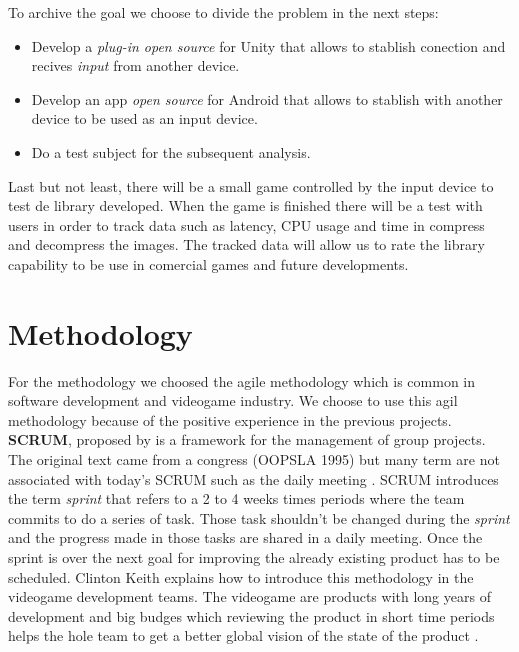 To archive the goal we choose to divide the problem in the next steps:

\begin {itemize}
\item Develop a \textit{plug-in open source} for Unity that allows to stablish conection and recives \textit{input} from another device.
\item Develop an app \textit{open source} for Android that allows to stablish with another device to be used as an input device.
\item Do a test subject for the subsequent analysis.
\end {itemize}

Last but not least, there will be a small game controlled by the input device to test de library developed. When the game is finished there will be a test with users in order to track data such as latency, CPU usage and time in compress and decompress the images. The tracked data will allow us to rate the library capability to be use in comercial games and future developments.\\

\section*{Methodology}

For the methodology we choosed the agile methodology which is common in software development and videogame industry. We choose to use this agil methodology because of the positive experience in the previous projects.\\

\textbf{SCRUM}, proposed by \cite{scrum} is a framework for the management of group projects. The original text came from a congress (OOPSLA 1995) but many term are not associated with today's SCRUM such as the daily meeting \citep{scrum2}. SCRUM introduces the term \textit{sprint} that refers to a 2 to 4 weeks times periods where the team commits to do a series of task. Those task shouldn't be changed during the \textit{sprint} and the progress made in those tasks are shared in a daily meeting. Once the sprint is over the next goal for improving the already existing product has to be scheduled. Clinton Keith explains how to introduce this methodology in the videogame development teams. The videogame are products with long years of development and big budges which reviewing the product in short time periods helps the hole team to get a better global vision of the state of the product \citep{keith2010agile}.\\

